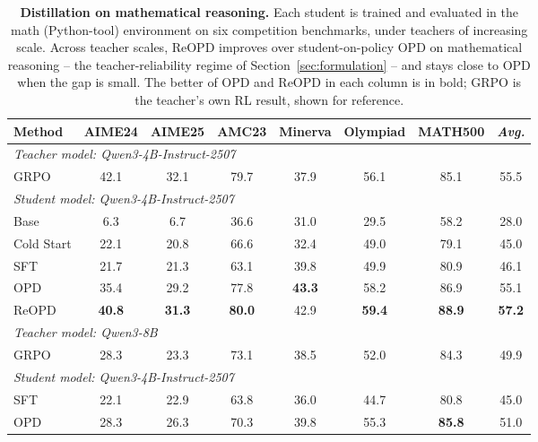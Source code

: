 \begin{table}[t]
    \caption{\textbf{Distillation on mathematical reasoning.}
    Each student is trained and evaluated in the math (Python-tool) environment on six
    competition benchmarks, under teachers of increasing scale. Across teacher scales,
    ReOPD improves over student-on-policy OPD on mathematical reasoning -- the
    teacher-reliability regime of Section~\ref{sec:formulation} -- and stays close
    to OPD when the gap is small. The better of OPD and ReOPD in each column is in
    bold; GRPO is the teacher's own RL result, shown for reference.}
    \label{tab:main_math_single}
    \footnotesize
    \centering
    \begin{tabular}{lccccccc}
        \toprule
            \textbf{Method} & \textbf{AIME24} & \textbf{AIME25} & \textbf{AMC23} & \textbf{Minerva} & \textbf{Olympiad} & \textbf{MATH500} & \textbf{\textit{Avg.}} \\
        \midrule
            \multicolumn{8}{l}{\textit{Teacher model: Qwen3-4B-Instruct-2507}} \\
            GRPO & 42.1 & 32.1 & 79.7 & 37.9 & 56.1 & 85.1 & 55.5 \\
        \cmidrule(lr){1-8}
            \multicolumn{8}{l}{\textit{Student model: Qwen3-4B-Instruct-2507}} \\
            Base & 6.3 & 6.7 & 36.6 & 31.0 & 29.5 & 58.2 & 28.0 \\
            Cold Start & 22.1 & 20.8 & 66.6 & 32.4 & 49.0 & 79.1 & 45.0 \\
            SFT & 21.7 & 21.3 & 63.1 & 39.8 & 49.9 & 80.9 & 46.1  \\
            OPD & 35.4 & 29.2 & 77.8 & \textbf{43.3} & 58.2 & 86.9 & 55.1 \\
            \rowcolor{myblue}
            ReOPD & \textbf{40.8} & \textbf{31.3} & \textbf{80.0} & 42.9 & \textbf{59.4} & \textbf{88.9} & \textbf{57.2}  \\
        \midrule
        \midrule
            \multicolumn{8}{l}{\textit{Teacher model: Qwen3-8B}} \\
            GRPO & 28.3 & 23.3 & 73.1 & 38.5 & 52.0 & 84.3 & 49.9 \\
        \cmidrule(lr){1-8}
            \multicolumn{8}{l}{\textit{Student model: Qwen3-4B-Instruct-2507}} \\
            SFT & 22.1 & 22.9 & 63.8 & 36.0 & 44.7 & 80.8 & 45.0 \\
            OPD & 28.3 & 26.3 & 70.3 & 39.8 & 55.3 & \textbf{85.8} & 51.0 \\

\end{tabular}
\end{table}
